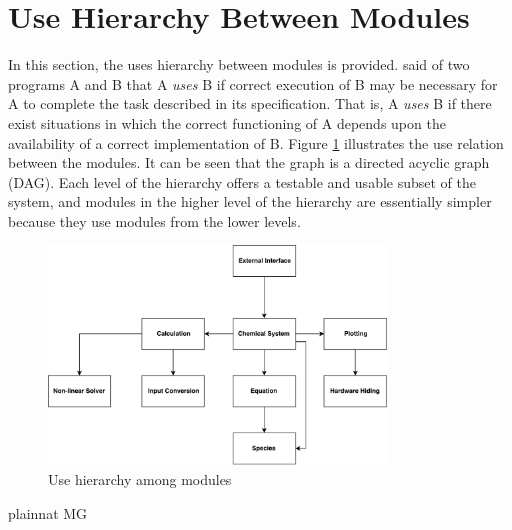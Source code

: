 \documentclass[12pt, titlepage]{article}
\begin{document}
\newpage
\section{Use Hierarchy Between Modules} \label{SecUse}

In this section, the uses hierarchy between modules is
provided. \citet{Parnas1978} said of two programs A and B that A {\em uses} B if
correct execution of B may be necessary for A to complete the task described in
its specification. That is, A {\em uses} B if there exist situations in which
the correct functioning of A depends upon the availability of a correct
implementation of B.  Figure \ref{FigUH} illustrates the use relation between
the modules. It can be seen that the graph is a directed acyclic graph
(DAG). Each level of the hierarchy offers a testable and usable subset of the
system, and modules in the higher level of the hierarchy are essentially simpler
because they use modules from the lower levels.

\begin{figure}[H]
\centering
\includegraphics[width=0.8\textwidth]{UsesHierarchy.pdf}
\caption{Use hierarchy among modules}
\label{FigUH}
\end{figure}


 {plainnat}
 {MG}
\end{document}
